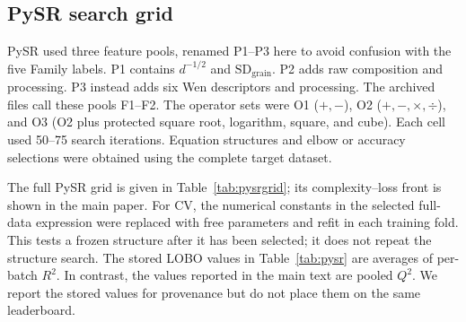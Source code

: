 \documentclass[a4paper,11pt]{article}
\begin{document}
\subsection{PySR search grid}

PySR used three feature pools, renamed P1--P3 here to avoid confusion with the five Family labels. P1 contains $d^{-1/2}$ and $\mathrm{SD}_{\mathrm{grain}}$. P2 adds raw composition and processing. P3 instead adds six Wen descriptors and processing. The archived files call these pools F1--F2. The operator sets were O1 ($+,-$), O2 ($+,-,\times,\div$), and O3 (O2 plus protected square root, logarithm, square, and cube). Each cell used 50--75 search iterations. Equation structures and elbow or accuracy selections were obtained using the complete target dataset.

The full PySR grid is given in Table~\ref{tab:pysrgrid}; its complexity--loss front is shown in the main paper. For CV, the numerical constants in the selected full-data expression were replaced with free parameters and refit in each training fold. This tests a frozen structure after it has been selected; it does not repeat the structure search. The stored LOBO values in Table~\ref{tab:pysr} are averages of per-batch $R^2$. In contrast, the values reported in the main text are pooled $Q^2$. We report the stored values for provenance but do not place them on the same leaderboard.
\end{document}
